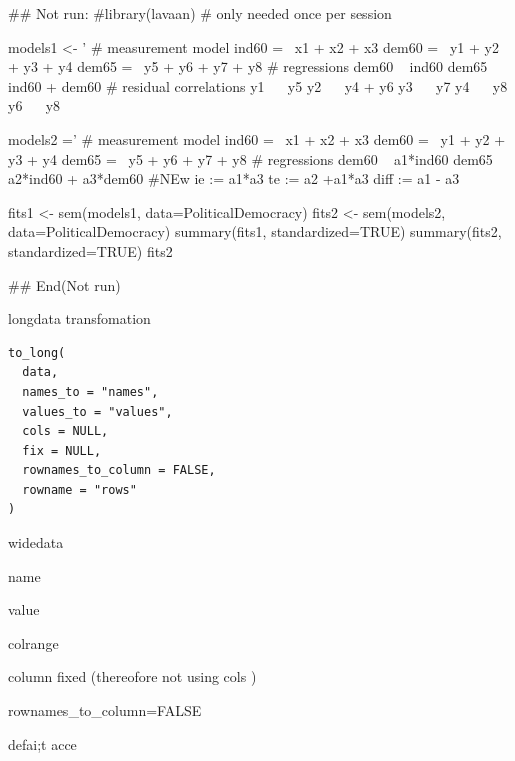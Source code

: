\documentclass[a4paper]{book}
\begin{document}
\begin{Examples}
\begin{ExampleCode}

\#\# Not run: 
#library(lavaan) # only needed once per session

models1 <- '
  # measurement model
    ind60 =~ x1 + x2 + x3
    dem60 =~ y1 + y2 + y3 + y4
    dem65 =~ y5 + y6 + y7 + y8
    # regressions
    dem60 ~ ind60
    dem65 ~ ind60 + dem60
      # residual correlations
    y1 ~~ y5
    y2 ~~ y4 + y6
    y3 ~~ y7
    y4 ~~ y8
    y6 ~~ y8

models2 ='
  # measurement model
    ind60 =~ x1 + x2 + x3
    dem60 =~ y1 + y2 + y3 + y4
    dem65 =~ y5 + y6 + y7 + y8
     # regressions
    dem60 ~ a1*ind60
    dem65 ~ a2*ind60 + a3*dem60
 #NEw
   ie := a1*a3
   te := a2 +a1*a3
   diff := a1 - a3




fits1 <- sem(models1, data=PoliticalDemocracy)
fits2 <- sem(models2, data=PoliticalDemocracy)
summary(fits1, standardized=TRUE)
summary(fits2, standardized=TRUE)
fits2 %

## End(Not run)

\end{ExampleCode}
\end{Examples}
%
\begin{Description}
longdata transfomation
\end{Description}
%
\begin{Usage}
\begin{verbatim}
to_long(
  data,
  names_to = "names",
  values_to = "values",
  cols = NULL,
  fix = NULL,
  rownames_to_column = FALSE,
  rowname = "rows"
)
\end{verbatim}
\end{Usage}
%
\begin{Arguments}
\begin{ldescription}
\item[\code{data}] widedata

\item[\code{names\_to}] name

\item[\code{values\_to}] value

\item[\code{cols}] colrange

\item[\code{fix}] column fixed (thereofore not using cols )

\item[\code{rownames\_to\_column}] rownames\_to\_column=FALSE

\item[\code{rowname}] defai;t acce
\end{ldescription}
\end{Arguments}
\end{document}
